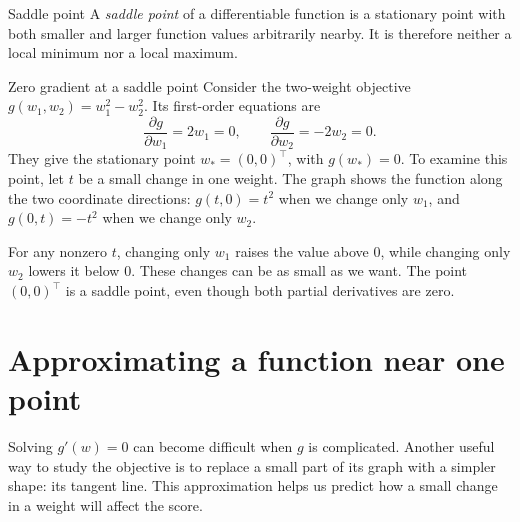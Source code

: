 \documentclass[a4paper,12pt,oneside]{report}
\begin{document}
\begin{frameddefn}{Saddle point}\label{def:saddle-point}
A \emph{saddle point} of a differentiable function is a stationary
point with both smaller and larger function values arbitrarily
nearby. It is therefore neither a local minimum nor a local maximum.
\end{frameddefn}

\begin{framedexample}{Zero gradient at a saddle point}
Consider the two-weight objective $g(w_1,w_2)=w_1^2-w_2^2$.
Its first-order equations are
\[
  \frac{\partial g}{\partial w_1}=2w_1=0,\qquad
  \frac{\partial g}{\partial w_2}=-2w_2=0.
\]
They give the stationary point $w_*=(0,0)^\top$, with $g(w_*)=0$.
To examine this point, let $t$ be a small change in one weight.
The graph shows the function along the two coordinate directions:
$g(t,0)=t^2$ when we change only $w_1$, and $g(0,t)=-t^2$ when
we change only $w_2$.

\begin{center}
\end{center}

For any nonzero $t$, changing only $w_1$ raises the value above $0$,
while changing only $w_2$ lowers it below $0$. These changes can be
as small as we want. The point $(0,0)^\top$ is a saddle point,
even though both partial derivatives are zero.
\end{framedexample}

\clearpage
\section{Approximating a function near one point}

Solving $g'(w)=0$ can become difficult when $g$ is complicated.
Another useful way to study the objective is to replace a small part
of its graph with a simpler shape: its tangent line. This approximation
helps us predict how a small change in a weight will affect the score.
\end{document}
